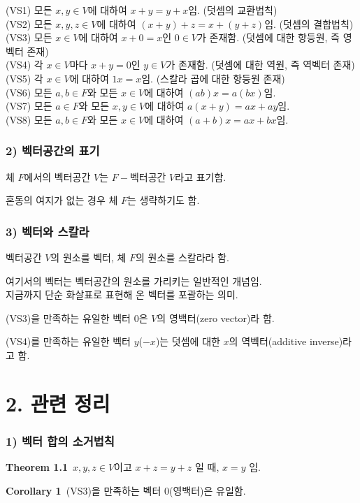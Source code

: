 \documentclass[10pt, a4paper]{article}
\begin{document}
(VS1) 모든 $x,y \in V$에 대하여 $x+y=y+x$임. (덧셈의 교환법칙)\\
(VS2) 모든 $x,y,z \in V$에 대하여 $(x+y)+z=x+(y+z)$임. (덧셈의 결합법칙)\\
(VS3) 모든 $x \in V$에 대하여 $x+0=x$인 $0 \in V$가 존재함. (덧셈에 대한 항등원, 즉 영벡터 존재)\\
(VS4) 각 $x \in V$마다 $x+y=0$인 $y \in V$가 존재함. (덧셈에 대한 역원, 즉 역벡터 존재)\\
(VS5) 각 $x \in V$에 대하여 $1x=x$임. (스칼라 곱에 대한 항등원 존재)\\
(VS6) 모든 $a,b \in F$와 모든 $x \in V$에 대하여 $(ab)x=a(bx)$임.\\
(VS7) 모든 $a \in F$와 모든 $x,y \in V$에 대하여 $a(x+y)=ax+ay$임.\\
(VS8) 모든 $a,b \in F$와 모든 $x \in V$에 대하여 $(a+b)x=ax+bx$임.

\subsubsection*{2) 벡터공간의 표기}
체 $F$에서의 벡터공간 $V$는 $F-$벡터공간 $V$라고 표기함.

혼동의 여지가 없는 경우 체 $F$는 생략하기도 함.

\subsubsection*{3) 벡터와 스칼라}
벡터공간 $V$의 원소를 벡터, 체 $F$의 원소를 스칼라라 함.

여기서의 벡터는 벡터공간의 원소를 가리키는 일반적인 개념임.\\
지금까지 단순 화살표로 표현해 온 벡터를 포괄하는 의미.

(VS3)을 만족하는 유일한 벡터 $0$은 $V$의 영백터(zero vector)라 함.

(VS4)를 만족하는 유일한 벡터 $y$($-x$)는 덧셈에 대한 $x$의 역벡터(additive inverse)라고 함.


\newpage


\section*{2. 관련 정리}
\subsubsection*{1) 벡터 합의 소거법칙}
\textbf{Theorem 1.1}\, $x,y,z \in V$이고 $x+z=y+z$ 일 때, $x = y$ 임.

\textbf{Corollary 1}\, (VS3)을 만족하는 벡터 $0$(영백터)은 유일함.
\end{document}
